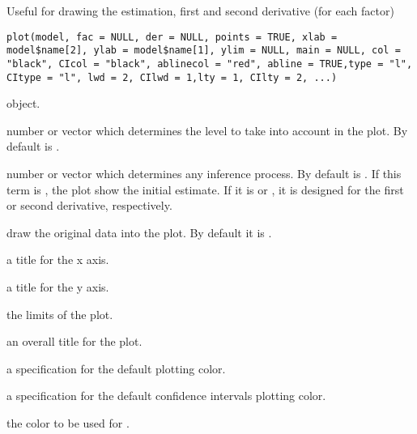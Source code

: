 %
\begin{Description}\relax
Useful for drawing the estimation, first and second derivative  (for each factor)
\end{Description}
%
\begin{Usage}
\begin{verbatim}
plot(model, fac = NULL, der = NULL, points = TRUE, xlab = model$name[2], ylab = model$name[1], ylim = NULL, main = NULL, col = "black", CIcol = "black", ablinecol = "red", abline = TRUE,type = "l", CItype = "l", lwd = 2, CIlwd = 1,lty = 1, CIlty = 2, ...)
\end{verbatim}
\end{Usage}
%
\begin{Arguments}
\begin{ldescription}
\item[\code{model}]  object.

\item[\code{fac}] number or vector which determines the level to take into account in the plot. By default is .

\item[\code{der}] number or vector which determines any inference process. By default  is . If this term is , the plot show the initial estimate. If it is  or , it is designed for the first or second derivative, respectively.

\item[\code{points}] draw the original data into the plot. By default it is . 

\item[\code{xlab}] 
a title for the x axis. 

\item[\code{ylab}] 
a title for the y axis.

\item[\code{ylim}] the  limits of the plot.

\item[\code{main}] an overall title for the plot.

\item[\code{col}] 
a specification for the default plotting color.

\item[\code{CIcol}] 
a specification for the default confidence intervals plotting color.

\item[\code{ablinecol}] the color to be used for .


\end{ldescription}
\end{Arguments}
